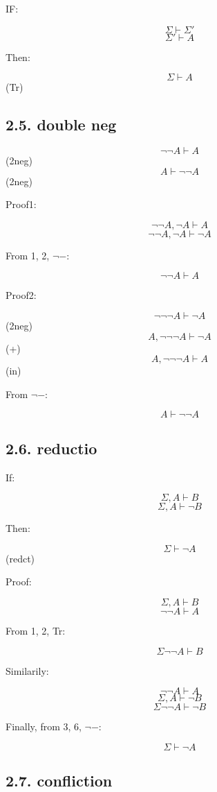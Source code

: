 \documentclass{article} %
\begin{document}
IF:

\[\Sigma \vdash \Sigma'\] \[\Sigma' \vdash A\]

Then:

\[\Sigma \vdash A\] (Tr)

\hypertarget{double-neg}{%
\subsection{2.5. double neg}\label{double-neg}}

\[\neg \neg A \vdash A\](2neg) \[A \vdash \neg \neg A\](2neg)

Proof1:

\[\neg \neg A , \neg A\vdash A\] \[\neg \neg A , \neg A\vdash \neg A\]

From 1, 2, \(\neg-\):

\[\neg \neg A \vdash A\]

Proof2:

\[\neg \neg \neg A \vdash \neg A\](2neg)
\[A, \neg \neg \neg A \vdash \neg A\](+)
\[A, \neg \neg \neg A \vdash A\](in)

From \(\neg -\):

\[A \vdash \neg \neg A\]

\hypertarget{reductio}{%
\subsection{2.6. reductio}\label{reductio}}

If:

\[\Sigma , A \vdash B\] \[\Sigma , A \vdash \neg B\]

Then:

\[\Sigma \vdash \neg A\] (redct)

Proof:

\[\Sigma ,A\vdash B\] \[\neg \neg A \vdash A\]

From 1, 2, Tr:

\[\Sigma \neg \neg A\vdash B\]

Similarily:

\[\neg \neg A \vdash A\] \[\Sigma ,A\vdash \neg B\]
\[\Sigma \neg \neg A\vdash \neg B\]

Finally, from 3, 6, \(\neg-\):

\[\Sigma \vdash \neg A\]

\hypertarget{confliction}{%
\subsection{2.7. confliction}\label{confliction}}
\end{document}
